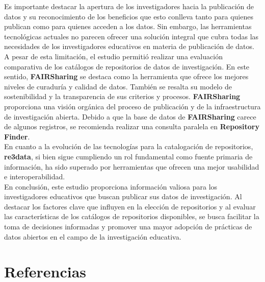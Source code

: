 \documentclass{article}
\begin{document}
Es importante destacar la apertura de los investigadores hacia la publicación de datos y su reconocimiento de los beneficios que esto conlleva tanto para quienes publican como para quienes acceden a los datos. Sin embargo, las herramientas tecnológicas actuales no parecen ofrecer una solución integral que cubra todas las necesidades de los investigadores educativos en materia de publicación de datos.\\

A pesar de esta limitación, el estudio permitió realizar una evaluación comparativa de los catálogos de repositorios de datos de investigación. En este sentido, \textbf{FAIRSharing} se destaca como la herramienta que ofrece los mejores niveles de curaduría y calidad de datos. También se resalta su modelo de sostenibilidad y la transparencia de sus criterios y procesos. \textbf{FAIRSharing} proporciona una visión orgánica del proceso de publicación y de la infraestructura de investigación abierta. Debido a que la base de datos de \textbf{FAIRSharing} carece de algunos registros, se recomienda realizar una consulta paralela en \textbf{Repository Finder}.\\

En cuanto a la evolución de las tecnologías para la catalogación de repositorios, \textbf{re3data}, si bien sigue cumpliendo un rol fundamental como fuente primaria de información, ha sido superado por herramientas que ofrecen una mejor usabilidad e interoperabilidad.\\

En conclusión, este estudio proporciona información valiosa para los investigadores educativos que buscan publicar sus datos de investigación. Al destacar los factores clave que influyen en la elección de repositorios y al evaluar las características de los catálogos de repositorios disponibles, se busca facilitar la toma de decisiones informadas y promover una mayor adopción de prácticas de datos abiertos en el campo de la investigación educativa.\\

\section{Referencias}


\end{document}
